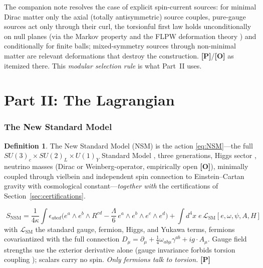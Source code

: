 \documentclass[11pt]{article}
\theoremstyle{definition}
\newtheorem{definition}[theorem]{Definition}
\newcommand{\pP}{\textbf{[P]}}
\newcommand{\pO}{\textbf{[O]}}
\begin{document}
The companion note \cite{McGwier2026b} resolves the case of explicit
spin-current sources: for minimal Dirac matter only the axial (totally
antisymmetric) source couples, pure-gauge sources act only through their
curl, the torsionful first law holds unconditionally on null planes (via
the Markov property \cite{CasiniTesteTorroba2017} and the FLPW deformation
theory \cite{FLPW2016,SarosiUgajin2018}) and conditionally for finite
balls; mixed-symmetry sources through non-minimal matter are relevant
deformations that destroy the construction. \pP{}/\pO{} as itemized there.
This \emph{modular selection rule} is what Part~II uses.

\part*{Part II: The Lagrangian}

\section{The New Standard Model}
\label{sec:nsm}

\begin{definition}
The New Standard Model (NSM) is the action \eqref{eq:NSM}---the full
$SU(3)_c\times SU(2)_L\times U(1)_Y$ Standard Model
\cite{Glashow1961,Weinberg1967,Salam1968}, three generations, Higgs sector
\cite{ATLAS2012,CMS2012}, neutrino masses \cite{SuperK1998} (Dirac or
Weinberg-operator, empirically open \pO{}), minimally coupled through
vielbein and independent spin connection to Einstein--Cartan gravity with
cosmological constant---\emph{together with} the certifications of
Section~\ref{sec:certifications}.
\end{definition}

\begin{equation}
\boxed{\;
S_{\mathrm{NSM}}
=\frac{1}{4\kappa}\!\int\!\epsilon_{abcd}\Big(e^a\wedge e^b\wedge R^{cd}
-\frac{\Lambda}{6}\,e^a\wedge e^b\wedge e^c\wedge e^d\Big)
+\int d^4x\;e\,\mathcal{L}_{\mathrm{SM}}[e,\omega,\psi,A,H]\;}
\label{eq:NSM}
\end{equation}
with $\mathcal L_{\mathrm{SM}}$ the standard gauge, fermion, Higgs, and
Yukawa terms, fermions covariantized with the full connection
$D_\mu=\partial_\mu+\tfrac14\omega_{ab\mu}\gamma^{ab}+i g\!\cdot\!A_\mu$.
Gauge field strengths use the exterior derivative alone (gauge invariance
forbids torsion coupling \cite{HehlRMP1976,Shapiro2002}); scalars carry no
spin. \emph{Only fermions talk to torsion.} \pP{}
\end{document}
